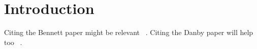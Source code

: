 \section{Introduction}
\label{sec:Introduction}
Citing the Bennett paper might be relevant ~\cite{Bennett2006}.
Citing the Danby paper will help too ~\cite{Danby2001}.
